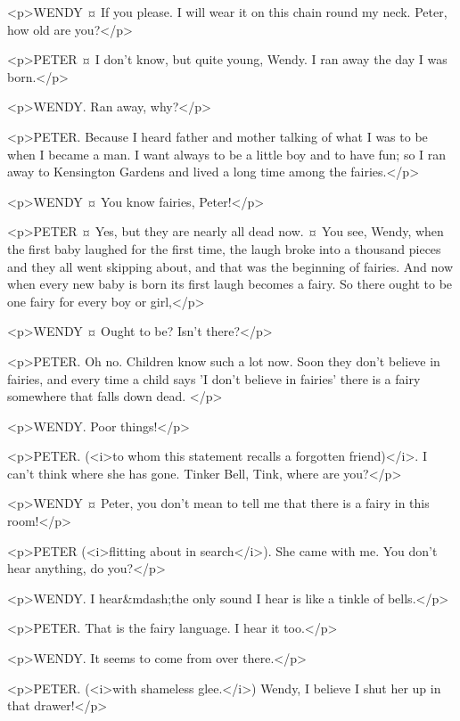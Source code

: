 <p>WENDY ¤
If you please.
I will wear it on this chain round my neck. Peter, how old are you?</p>

<p>PETER ¤
I don't know, but quite young, Wendy. I ran away the day I was born.</p>

<p>WENDY. Ran away, why?</p>

<p>PETER. Because I heard father and mother talking of what I was to be when I became a man. I want always to be a little boy and to have fun; so I ran away to Kensington Gardens and lived a long time among the fairies.</p>

<p>WENDY ¤
You know fairies, Peter!</p>

<p>PETER ¤
Yes, but they are nearly all dead now.
¤
You see, Wendy, when the first baby laughed for the first time, the laugh broke into a thousand pieces and they all went skipping about, and that was the beginning of fairies. And now when every new baby is born its first laugh becomes a fairy. So there ought to be one fairy for every boy or girl,</p>

<p>WENDY ¤
Ought to be? Isn't there?</p>

<p>PETER. Oh no. Children know such a lot now. Soon they don't believe in fairies, and every time a child says 'I don't believe in fairies' there is a fairy somewhere that falls down dead.
</p>

<p>WENDY. Poor things!</p>

<p>PETER. (<i>to whom this statement recalls a forgotten friend)</i>. I can't think where she has gone. Tinker Bell, Tink, where are you?</p>

<p>WENDY ¤
Peter, you don't mean to tell me that there is a fairy in this room!</p>

<p>PETER (<i>flitting about in search</i>). She came with me. You don't hear anything, do you?</p>

<p>WENDY. I hear&mdash;the only sound I hear is like a tinkle of bells.</p>

<p>PETER. That is the fairy language. I hear it too.</p>

<p>WENDY. It seems to come from over there.</p>

<p>PETER. (<i>with shameless glee.</i>) Wendy, I believe I shut her up in that drawer!</p>

